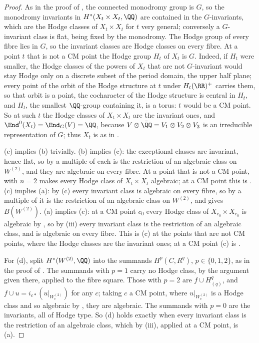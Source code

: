 \begin{proof}
As in the proof of , the connected monodromy group
is $G$, so the monodromy invariants in $H^{*}(X_{t}\times X_{t},\QQ)$ are
contained in the $G$-invariants, which are the Hodge classes of
$X_{t}\times X_{t}$ for $t$ very general; conversely a $G$-invariant class is
flat, being fixed by the monodromy. The Hodge group of every fibre lies in
$G$, so the invariant classes are Hodge classes on every fibre. At a point $t$
that is not a CM point the Hodge group $H_{t}$ of $X_{t}$ is $G$. Indeed, if
$H_{t}$ were smaller, the Hodge classes of the powers of $X_{t}$ that are not
$G$-invariant would stay Hodge only on a discrete subset of the period
domain, the upper half plane; every point of the orbit of the Hodge structure
at $t$ under $H_{t}(\RR)^{+}$ carries them, so that orbit is a point, the
cocharacter of the Hodge structure is central in $H_{t}$, and $H_{t}$, the
smallest $\QQ$-group containing it, is a torus: $t$ would be a CM point. So
at such $t$ the Hodge classes of $X_{t}\times X_{t}$ are the invariant ones,
and $\End^{0}(X_{t})=\End_{G}(V)=\QQ$, because
$V\otimes\bar{\QQ}=V_{1}\otimes V_{2}\otimes V_{3}$ is an irreducible
representation of $G$; thus $X_{t}$ is as in .

(c) implies (b) trivially. (b) implies (c): the exceptional classes are
invariant, hence flat, so by  a multiple of each is the
restriction of an algebraic class on $W^{(2)}$, and they are algebraic on
every fibre. At a point that is not a CM point,  with
$n=2$ makes every Hodge class of $X_{t}\times X_{t}$ algebraic; at a CM point
this is . (c) implies (a): by (c) every invariant class is
algebraic on every fibre, so by  a multiple of it is the
restriction of an algebraic class on $W^{(2)}$, and
 gives $B(W^{(2)})$. (a) implies (c): at a CM point
$c_{0}$ every Hodge class of $X_{c_{0}}\times X_{c_{0}}$ is algebraic by
, so by (iii) every
invariant class is the restriction of an algebraic class, and is algebraic on
every fibre. This is (c) at the points that are not CM points, where the
Hodge classes are the invariant ones; at a CM point (c) is
.

For (d), split $H^{*}(W^{(2)},\QQ)$ into the summands $H^{p}(C,R^{q})$,
$p\in\{0,1,2\}$, as in the proof of . The summands
with $p=1$ carry no Hodge class, by the argument given there, applied to the
fibre square. Those with $p=2$ are $f\cup H^{q}_{(q)}$, and
$f\cup u=i_{c*}(u|_{W^{(2)}_{c}})$ for any $c$; taking $c$ a CM point, where
$u|_{W^{(2)}_{c}}$ is a Hodge class and so algebraic by ,
they are algebraic. The summands with $p=0$ are the invariants, all of Hodge
type. So (d) holds exactly when every invariant class is the restriction of an
algebraic class, which by (iii), applied at a
CM point, is (a).
\end{proof}

